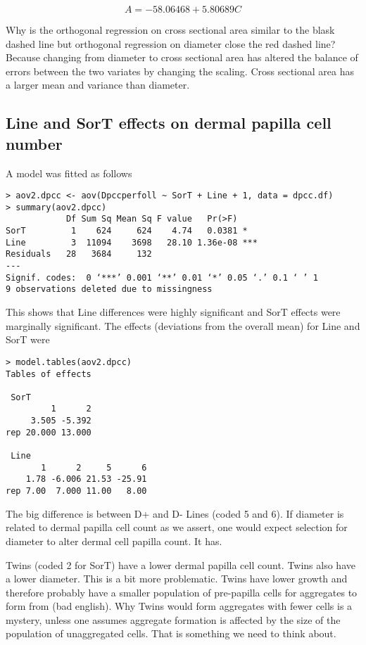\documentclass[titlepage]{article}  %
\begin{document}
\begin{displaymath}
A = -58.06468 + 5.80689 C
\end{displaymath}


Why is the orthogonal regression on cross sectional area similar to the blask dashed line but orthogonal regression on diameter close the red dashed line?  Because changing from diameter to cross sectional area has altered the balance of errors between the two variates by changing the scaling.  Cross sectional area has a larger mean and variance than diameter. 


\subsection{Line and SorT effects on dermal papilla cell number}
A model was fitted as follows
\begin{verbatim}
> aov2.dpcc <- aov(Dpccperfoll ~ SorT + Line + 1, data = dpcc.df)
> summary(aov2.dpcc)
            Df Sum Sq Mean Sq F value   Pr(>F)    
SorT         1    624     624    4.74   0.0381 *  
Line         3  11094    3698   28.10 1.36e-08 ***
Residuals   28   3684     132                     
---
Signif. codes:  0 ‘***’ 0.001 ‘**’ 0.01 ‘*’ 0.05 ‘.’ 0.1 ‘ ’ 1
9 observations deleted due to missingness
\end{verbatim}
 This shows that Line differences were highly significant and  SorT effects were marginally significant.
The effects (deviations from the overall mean) for Line and SorT were
\begin{verbatim}
> model.tables(aov2.dpcc)
Tables of effects

 SorT 
         1      2
     3.505 -5.392
rep 20.000 13.000

 Line 
       1      2     5      6
    1.78 -6.006 21.53 -25.91
rep 7.00  7.000 11.00   8.00
\end{verbatim}
  The big difference is between D+ and D- Lines (coded 5 and 6). If diameter is related to dermal papilla cell count as we assert, one would expect selection for diameter to alter dermal cell papilla count. It has.

 Twins (coded 2 for SorT) have a lower dermal papilla cell count. Twins also have a lower diameter. This is a bit more problematic. Twins have lower growth and therefore probably have a smaller population of pre-papilla cells for aggregates to form from (bad english). Why Twins would form aggregates with fewer cells is a mystery, unless one assumes aggregate formation is affected by the size of the population of unaggregated cells. That is something we need to think about.
 
\end{document}
